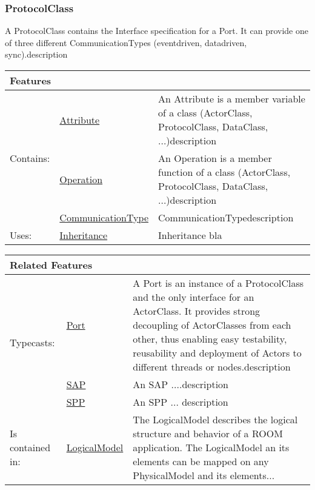 			
		
		\subsubsection{ProtocolClass}
			\hypertarget{ref:ProtocolClass}{}
			
			A ProtocolClass contains the Interface specification for a Port. It can provide one of three different CommunicationTypes (eventdriven, datadriven, sync).description 
			
			
			\vspace{\baselineskip}
			\begingroup
			\renewcommand{\arraystretch}{1.8} %
			\parbox{\textwidth}{
			\begin{longtable}{l l p{}}
				\multicolumn{2}{l}{\textbf{\large Features}} & \\
				\hline
			\multirow{3}{*}{Contains:} & \tabitem \hyperlink{ref:Attribute}{Attribute}  & An Attribute is a member variable of a class (ActorClass, ProtocolClass, DataClass, ...)description \\
			& \tabitem \hyperlink{ref:Operation}{Operation}  & An Operation is a member function of a class (ActorClass, ProtocolClass, DataClass, ...)description  \\
			& \tabitem \hyperlink{ref:CommunicationType}{CommunicationType}  & CommunicationTypedescription \\
			\hline
			Uses: & \tabitem \hyperlink{ref:Inheritance}{Inheritance}  & Inheritance bla\\
			\hline
			\end{longtable}	
			}
			\endgroup
			\vspace{\baselineskip}
			
			\vspace{\baselineskip}
			\begingroup
			\renewcommand{\arraystretch}{1.8} %
			\parbox{\textwidth}{
			\begin{longtable}{l l p{}}
				\multicolumn{2}{l}{\textbf{\large Related Features}} & \\
				\hline
			\multirow{3}{*}{Typecasts:} & \tabitem \hyperlink{ref:Port}{Port}  & A Port is an instance of a ProtocolClass and the only interface for an ActorClass. It provides strong decoupling of ActorClasses from each other, thus enabling easy testability, reusability and deployment of Actors to different threads or nodes.description \\
			& \tabitem \hyperlink{ref:SAP}{SAP}  & An SAP ....description  \\
			& \tabitem \hyperlink{ref:SPP}{SPP}  & An SPP ... description \\
			\hline
			Is contained in: & \tabitem \hyperlink{ref:LogicalModel}{LogicalModel}  & The LogicalModel describes the logical structure and behavior of a ROOM application. The LogicalModel an its elements can be mapped on any PhysicalModel and its elements...\\
			\hline
			\end{longtable}	
			}
			\endgroup
			\vspace{\baselineskip}
			
